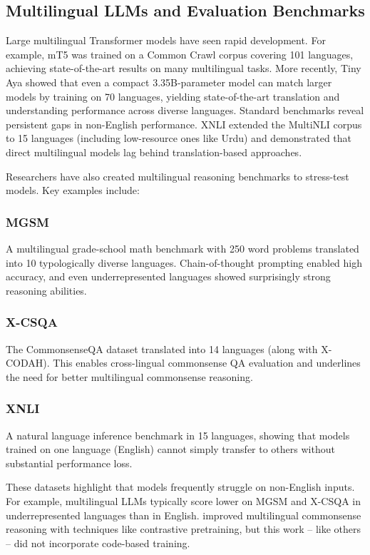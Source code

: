 \documentclass[conference]{IEEEtran}
\begin{document}
\subsection{Multilingual LLMs and Evaluation Benchmarks}
Large multilingual Transformer models have seen rapid development. For example, mT5 \cite{xue-etal-2021-mt5} was trained on a Common Crawl corpus covering 101 languages, achieving state-of-the-art results on many multilingual tasks. More recently, Tiny Aya \cite{salamanca2026tinyayabridgingscale} showed that even a compact 3.35B-parameter model can match larger models by training on 70 languages, yielding state-of-the-art translation and understanding performance across diverse languages. Standard benchmarks reveal persistent gaps in non-English performance. XNLI \cite{conneau-etal-2018-xnli} extended the MultiNLI corpus to 15 languages (including low-resource ones like Urdu) and demonstrated that direct multilingual models lag behind translation-based approaches.  

Researchers have also created multilingual reasoning benchmarks to stress-test models. Key examples include: 

\subsubsection{MGSM \cite{msgm}}
A multilingual grade-school math benchmark with 250 word problems translated into 10 typologically diverse languages. Chain-of-thought prompting enabled high accuracy, and even underrepresented languages showed surprisingly strong reasoning abilities.

\subsubsection{X-CSQA \cite{lin-etal-2021-common}}
The CommonsenseQA dataset translated into 14 languages (along with X-CODAH). This enables cross-lingual commonsense QA evaluation and underlines the need for better multilingual commonsense reasoning.

\subsubsection{XNLI \cite{conneau-etal-2018-xnli}}
A natural language inference benchmark in 15 languages, showing that models trained on one language (English) cannot simply transfer to others without substantial performance loss.

These datasets highlight that models frequently struggle on non-English inputs. For example, multilingual LLMs typically score lower on MGSM and X-CSQA in underrepresented languages than in English. \citeauthor{lin-etal-2021-common} improved multilingual commonsense reasoning with techniques like contrastive pretraining, but this work – like others – did not incorporate code-based training. 
\end{document}
